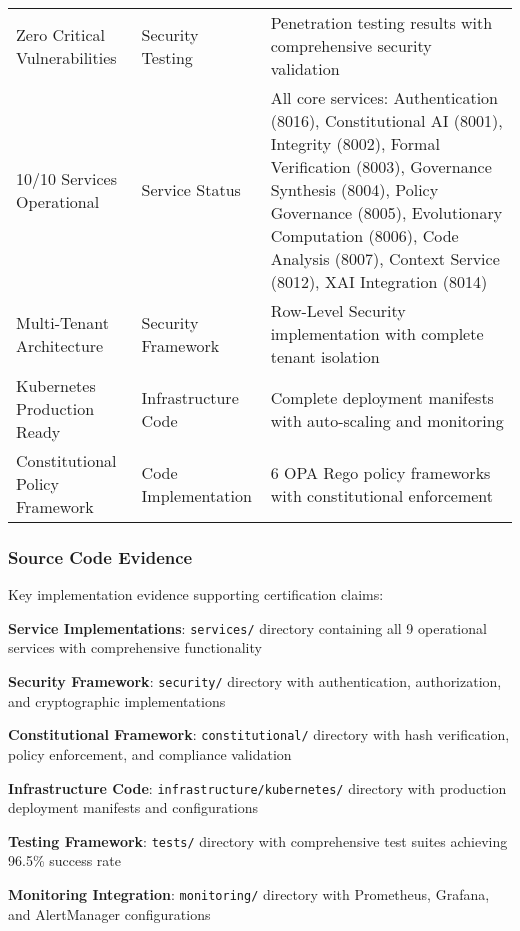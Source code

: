 \begin{table}[!htb]
\begin{tabular}{@{}p{3.5cm}p{2.5cm}p{6.5cm}@{}}
Zero Critical Vulnerabilities & Security Testing & Penetration testing results with comprehensive security validation \\
10/10 Services Operational & Service Status & All core services: Authentication (8016), Constitutional AI (8001), Integrity (8002), Formal Verification (8003), Governance Synthesis (8004), Policy Governance (8005), Evolutionary Computation (8006), Code Analysis (8007), Context Service (8012), XAI Integration (8014) \\
Multi-Tenant Architecture & Security Framework & Row-Level Security implementation with complete tenant isolation \\
Kubernetes Production Ready & Infrastructure Code & Complete deployment manifests with auto-scaling and monitoring \\
Constitutional Policy Framework & Code Implementation & 6 OPA Rego policy frameworks with constitutional enforcement \\
\bottomrule
\end{tabular}
\end{table}

\subsubsection{Source Code Evidence}
Key implementation evidence supporting certification claims:

\noindent\textbf{Service Implementations}: \texttt{services/} directory containing all 9 operational services with comprehensive functionality

\noindent\textbf{Security Framework}: \texttt{security/} directory with authentication, authorization, and cryptographic implementations

\noindent\textbf{Constitutional Framework}: \texttt{constitutional/} directory with hash verification, policy enforcement, and compliance validation

\noindent\textbf{Infrastructure Code}: \texttt{infrastructure/kubernetes/} directory with production deployment manifests and configurations

\noindent\textbf{Testing Framework}: \texttt{tests/} directory with comprehensive test suites achieving 96.5\% success rate

\noindent\textbf{Monitoring Integration}: \texttt{monitoring/} directory with Prometheus, Grafana, and AlertManager configurations

